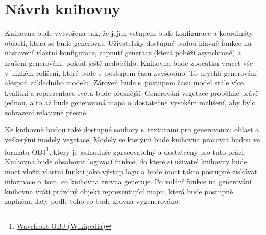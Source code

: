 \section{Návrh knihovny}
Knihovna bude vytvořena tak, že jejím vstupem bude konfigurace a koordináty oblasti, která se bude generovat. Uživatelsky dostupné budou hlavně funkce na nastavení vlastní konfigurace, zapnutí generace (která poběží asynchroně) a zrušení generování, pokud ještě nedoběhlo. Knihovna bude zpočátku vracet vše v~nízkém rolišení, které bude s~postupem času zvyšováno. To urychlí generování alespoň základního modelu. Zároveň bude s~postupem času model stále více kvalitní a reprezentace světa bude přesnější. Generování vegetace proběhne právě jednou, a to až bude generovaná mapa o~dostatečně vysokém rozlišení, aby bylo zobrazení relativně přesné.

Ke knihovně budou také dostupné soubory s~texturami pro generovanou oblast a veškerými modely vegetace. Modely se kterými bude knihovna pracovat budou ve formátu OBJ\footnote{\href{https://en.wikipedia.org/wiki/Wavefront_.obj_file}{Wavefront OBJ (Wikipedia)}}, který je jednoduše zpracovatelný a dostatečný pro tuto práci. Knihovna bude obsahovat logovací funkce, do které si uživatel knihovny bude moct vložit vlastní funkci jako výstup logu a bude moct takto postupně získávat informace o~tom, co knihovna zrovna generuje. Po volání funkce na generování knihovna vrátí prázdný objekt reprezentující mapu, která bude postupně zaplněna daty podle toho co bude zrovna vygenerováno.

